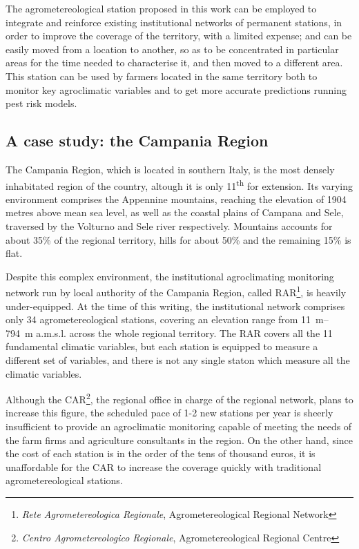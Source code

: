 \documentclass[conference]{IEEEtran}
\begin{document}
The agrometereological station  proposed in this work can be employed to integrate and reinforce existing institutional networks of permanent stations, in order to improve the coverage of the territory, with a limited expense; and can be easily moved from a location to another, so as to be concentrated in particular areas for the time needed to characterise it, and then moved to a different area.
This station can be used by farmers located in the same territory both to monitor key agroclimatic variables and to get more accurate predictions running pest risk models.

\subsection{A case study: the Campania Region}
The Campania Region, which is located in southern Italy, is the most densely inhabitated region of the country, altough it is only 11\textsuperscript{th} for extension. Its varying environment comprises the Appennine mountains, reaching the elevation of 1904 metres above mean sea level, as well as the coastal plains of Campana and Sele, traversed by the Volturno and Sele river respectively. Mountains accounts for about 35\% of the regional territory, hills for about 50\% and the remaining 15\% is flat.

Despite this complex environment, the institutional agroclimating monitoring network run by local authority of the Campania Region, called RAR\footnote{\emph{Rete Agrometereologica Regionale}, Agrometereological Regional Network}, is heavily under-equipped. At the time of this writing, the institutional network comprises only 34 agrometereological stations, covering an elevation range from \SIrange{11}{794}{\metre} a.m.s.l. across the whole regional territory. The RAR covers all the 11 fundamental climatic variables, but each station is equipped to measure a different set of variables, and there is not any single staton which measure all the climatic variables.

Although the CAR\footnote{\emph{Centro Agrometereologico Regionale}, Agrometereological Regional Centre}, the regional office in charge of the regional network, plans to increase this figure, the scheduled pace of 1-2 new stations per year is sheerly insufficient to provide an agroclimatic monitoring capable of meeting the needs of the farm firms and agriculture consultants in the region. 
On the other hand, since the cost of each station is in the order of the tens of thousand euros, it is unaffordable for the CAR to increase the coverage quickly with traditional agrometereological stations.
\end{document}
